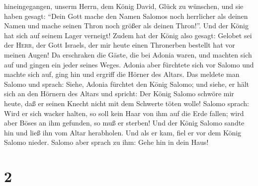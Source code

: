 hineingegangen, unserm Herrn, dem König David, Glück zu wünschen, und
sie haben gesagt: ``Dein Gott mache den Namen Salomos noch herrlicher
als deinen Namen und mache seinen Thron noch größer als deinen Thron!''.
Und der König hat sich auf seinem Lager verneigt!  Zudem
hat der König also gesagt: Gelobet sei der \textsc{Herr}, der Gott
Israels, der mir heute einen Thronerben bestellt hat vor meinen Augen!
 Da erschraken die Gäste, die bei Adonia waren, und
machten sich auf und gingen ein jeder seines Weges. 
Adonia aber fürchtete sich vor Salomo und machte sich auf, ging hin und
ergriff die Hörner des Altars.  Das meldete man Salomo
und sprach: Siehe, Adonia fürchtet den König Salomo; und siehe, er hält
sich an den Hörnern des Altars und spricht: Der König Salomo schwöre mir
heute, daß er seinen Knecht nicht mit dem Schwerte töten wolle!
 Salomo sprach: Wird er sich wacker halten, so soll kein
Haar von ihm auf die Erde fallen; wird aber Böses an ihm gefunden, so
muß er sterben!  Und der König Salomo sandte hin und ließ
ihn vom Altar herabholen. Und als er kam, fiel er vor dem König Salomo
nieder. Salomo aber sprach zu ihm: Gehe hin in dein Haus!

\hypertarget{section-1}{%
\section{2}\label{section-1}}

